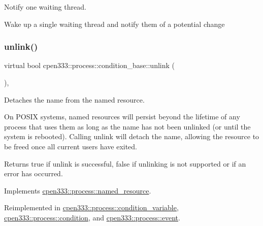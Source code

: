 Notify one waiting thread. 

Wake up a single waiting thread and notify them of a potential change \mbox{\label{classcpen333_1_1process_1_1condition__base_acd6d0b53a828aa161ccad06885eaa15c}} 
\subsubsection{\texorpdfstring{unlink()}{unlink()}\hspace{0.1cm}{\footnotesize\ttfamily [1/2]}}
{\footnotesize\ttfamily virtual bool cpen333\+::process\+::condition\+\_\+base\+::unlink (\begin{DoxyParamCaption}{ }\end{DoxyParamCaption})\hspace{0.3cm}{\ttfamily [inline]}, {\ttfamily [virtual]}}



Detaches the name from the named resource. 

On P\+O\+S\+IX systems, named resources will persist beyond the lifetime of any process that uses them as long as the name has not been unlinked (or until the system is rebooted). Calling {\ttfamily unlink} will detach the name, allowing the resource to be freed once all current users have exited.

\begin{DoxyReturn}{Returns}
{\ttfamily true} if unlink is successful, {\ttfamily false} if unlinking is not supported or if an error has occurred. 
\end{DoxyReturn}


Implements \hyperlink{classcpen333_1_1process_1_1named__resource_a5d33168fee48c9b0c58ab8fd96e230ce}{cpen333\+::process\+::named\+\_\+resource}.



Reimplemented in \hyperlink{classcpen333_1_1process_1_1condition__variable_a2861ec071acc52be7ca5790edd062ee8}{cpen333\+::process\+::condition\+\_\+variable}, \hyperlink{classcpen333_1_1process_1_1condition_a7c646204b2c4912185ba6055c9afa3f6}{cpen333\+::process\+::condition}, and \hyperlink{classcpen333_1_1process_1_1event_a37a2d53cbf4a90da6b4dbd5853f23b32}{cpen333\+::process\+::event}.

